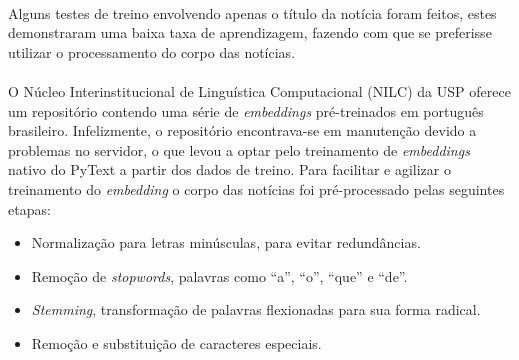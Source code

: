 \documentclass[grad,numbers]{coppe}
\begin{document}
  			\paragraph{}Alguns testes de treino envolvendo apenas o título da notícia foram feitos, estes demonstraram uma baixa taxa de aprendizagem, fazendo com que se preferisse utilizar o processamento do corpo das notícias.
  			\paragraph{}O Núcleo Interinstitucional de Linguística Computacional (NILC) da USP oferece um repositório\cite{nilc-repo} contendo uma série de \textit{embeddings} pré-treinados em português brasileiro. Infelizmente, o repositório encontrava-se em manutenção devido a problemas no servidor, o que levou a optar pelo treinamento de \textit{embeddings} nativo do PyText a partir dos dados de treino. Para facilitar e agilizar o treinamento do \textit{embedding} o corpo das notícias foi pré-processado pelas seguintes etapas:
  			\begin{itemize}
  				\item Normalização para letras minúsculas, para evitar redundâncias.
  				\item Remoção de \textit{stopwords}, palavras como ``a'', ``o'', ``que'' e ``de''.
  				\item \textit{Stemming}, transformação de palavras flexionadas para sua forma radical.
  				\item Remoção e substituição de caracteres especiais.
  			\end{itemize}
\end{document}
